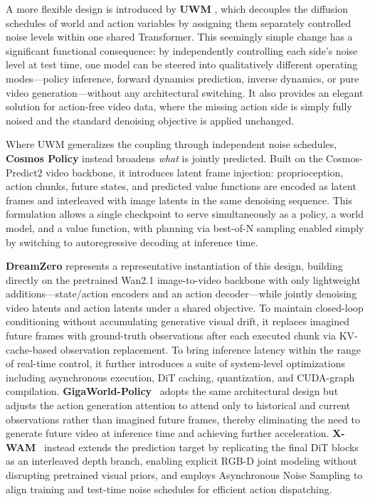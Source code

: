 A more flexible design is introduced by \textbf{UWM} \cite{UWM}, which decouples the diffusion schedules of world and action variables by assigning them separately controlled noise levels within one shared Transformer. This seemingly simple change has a significant functional consequence: by independently controlling each side's noise level at test time, one model can be steered into qualitatively different operating modes—policy inference, forward dynamics prediction, inverse dynamics, or pure video generation—without any architectural switching. It also provides an elegant solution for action-free video data, where the missing action side is simply fully noised and the standard denoising objective is applied unchanged.

Where UWM generalizes the coupling through independent noise schedules, \textbf{Cosmos Policy} \cite{CosmosPolicy} instead broadens \textit{what} is jointly predicted. Built on the Cosmos-Predict2 \cite{cosmos-predict2} video backbone, it introduces latent frame injection: proprioception, action chunks, future states, and predicted value functions are encoded as latent frames and interleaved with image latents in the same denoising sequence. This formulation allows a single checkpoint to serve simultaneously as a policy, a world model, and a value function, with planning via best-of-N sampling enabled simply by switching to autoregressive decoding at inference time.



\textbf{DreamZero} \cite{DreamZero} represents a representative instantiation of this design, building directly on the pretrained Wan2.1 \cite{Wan} image-to-video backbone with only lightweight additions—state/action encoders and an action decoder—while jointly denoising video latents and action latents under a shared objective. To maintain closed-loop conditioning without accumulating generative visual drift, it replaces imagined future frames with ground-truth observations after each executed chunk via KV-cache-based observation replacement. To bring inference latency within the range of real-time control, it further introduces a suite of system-level optimizations including asynchronous execution, DiT caching, quantization, and CUDA-graph compilation. 
\textbf{GigaWorld-Policy}~\cite{gigaworld-policy} adopts the same architectural design but adjusts the action generation attention to attend only to historical and current observations rather than imagined future frames, thereby eliminating the need to generate future video at inference time and achieving further acceleration. 
\textbf{X-WAM}~\cite{guo2026xwam} instead extends the prediction target by replicating the final DiT blocks as an interleaved depth branch, enabling explicit RGB-D joint modeling without disrupting pretrained visual priors, and employs Asynchronous Noise Sampling to align training and test-time noise schedules for efficient action dispatching.

